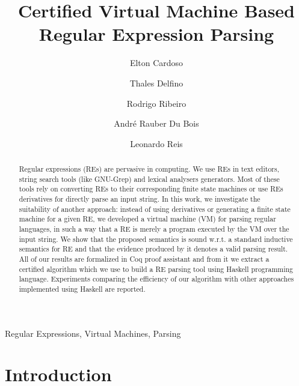 \documentclass[review]{elsarticle}
\theoremstyle{definition}
\begin{document}
\begin{frontmatter}

\title{Certified Virtual Machine Based Regular Expression Parsing}

\author{Elton Cardoso}
\address{Departamento de Computa\c{c}\~ao e Sistemas - DECSI, Universidade Federal de Ouro Preto}
\author{Thales Delfino}
\author{Rodrigo Ribeiro}
\address{Programa de P\'os-Gradua\c{c}\~ao em Ci\^encia da Computa\c{c}\~ao -
  PPGCC, Universidade Federal de Ouro Preto}
\author{Andr\'e Rauber Du Bois}
\address{Programa de P\'os-Gradua\c{c}\~ao em Computa\c{c}\~ao -
  PPGC, Universidade Federal de Pelotas}
\author{Leonardo Reis}
\address{Departamento de Computa\c{c}\~ao, Universidade Federal de Juiz de Fora}


\begin{abstract}
Regular expressions (REs) are pervasive in computing. We use REs in text editors, string search tools
(like GNU-Grep) and lexical analysers generators. Most of these tools rely on
converting REs to their corresponding finite state machines or use REs derivatives for directly parse an
input string. In this work, we investigate the suitability of another approach: instead of
using derivatives or generating a finite state machine for a given RE, we developed a virtual machine
(VM) for parsing regular languages, in such a way that a RE is merely a program executed by the VM
over the input string. We show that the proposed semantics is sound w.r.t. a standard
inductive semantics for RE and that the evidence produced by it denotes a valid parsing result.
All of our results are formalized in Coq proof assistant and from it we extract a certified algorithm
which we use to build a RE parsing tool using Haskell programming language. Experiments comparing the
efficiency of our algorithm with other approaches implemented using Haskell are reported.
\end{abstract}

\begin{keyword}
Regular Expressions, Virtual Machines, Parsing
\end{keyword}

\end{frontmatter}

\linenumbers

%

\section{Introduction}\label{sec:intro}
\end{document}
